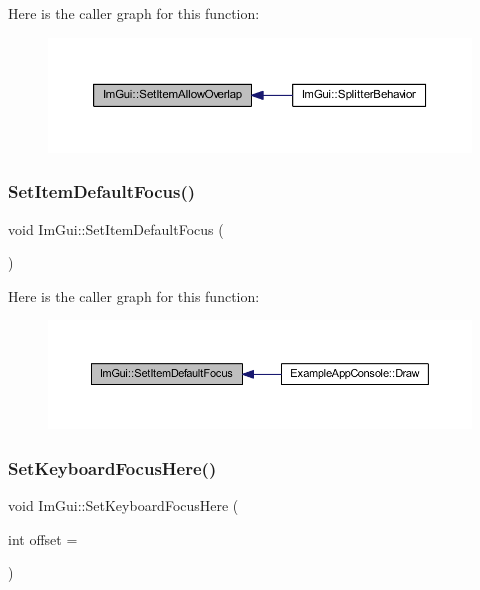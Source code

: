 Here is the caller graph for this function\+:
\nopagebreak
\begin{figure}[H]
\begin{center}
\leavevmode
\includegraphics[width=350pt]{namespace_im_gui_a3291356b06ebe5f771d60b334a831d4b_icgraph}
\end{center}
\end{figure}
\mbox{\label{namespace_im_gui_a3720a69496e9b8cf110a11dfe7d334e6}} 
\subsubsection{\texorpdfstring{Set\+Item\+Default\+Focus()}{SetItemDefaultFocus()}}
{\footnotesize\ttfamily void Im\+Gui\+::\+Set\+Item\+Default\+Focus (\begin{DoxyParamCaption}{ }\end{DoxyParamCaption})}

Here is the caller graph for this function\+:
\nopagebreak
\begin{figure}[H]
\begin{center}
\leavevmode
\includegraphics[width=350pt]{namespace_im_gui_a3720a69496e9b8cf110a11dfe7d334e6_icgraph}
\end{center}
\end{figure}
\mbox{\label{namespace_im_gui_ae85e5fba7e88cea8bd3ba5b687c979f2}} 
\subsubsection{\texorpdfstring{Set\+Keyboard\+Focus\+Here()}{SetKeyboardFocusHere()}}
{\footnotesize\ttfamily void Im\+Gui\+::\+Set\+Keyboard\+Focus\+Here (\begin{DoxyParamCaption}\item[{int}]{offset = {} }\end{DoxyParamCaption})}

